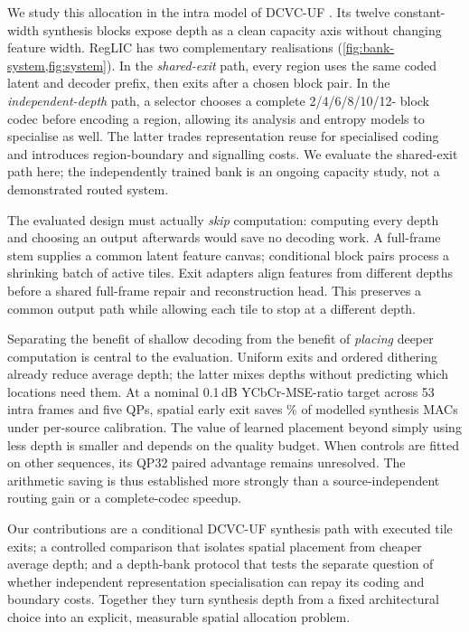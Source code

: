 We study this allocation in the intra model of DCVC-UF
\cite{li2026dcvcuf}. Its twelve constant-width synthesis blocks expose
depth as a clean capacity axis without changing feature width. RegLIC
has two complementary realisations (\cref{fig:bank-system,fig:system}). In the
\emph{shared-exit} path, every region uses the same coded latent and
decoder prefix, then exits after a chosen block pair. In the
\emph{independent-depth} path, a selector chooses a complete 2/4/6/8/10/12-
block codec before encoding a region, allowing its analysis and entropy
models to specialise as well. The latter trades representation reuse
for specialised coding and introduces region-boundary and signalling
costs. We evaluate the shared-exit path here; the independently trained
bank is an ongoing capacity study, not a demonstrated routed system.

The evaluated design must actually \emph{skip} computation: computing
every depth and choosing an output afterwards would save no decoding
work. A full-frame stem supplies a common latent feature canvas;
conditional block pairs process a shrinking batch of active tiles.
Exit adapters align features from different depths before a shared
full-frame repair and reconstruction head. This preserves a common
output path while allowing each tile to stop at a different depth.

Separating the benefit of shallow decoding from the benefit of
\emph{placing} deeper computation is central to the evaluation.
Uniform exits and ordered dithering already reduce average depth;
the latter mixes depths without predicting which locations need them.
At a nominal 0.1\,dB YCbCr-MSE-ratio target across 53 intra frames and
five QPs, spatial early exit saves \MainRouterSaving\% of modelled
synthesis MACs under per-source calibration. The value of learned
placement beyond simply using less depth is smaller and depends on the
quality budget. When controls are fitted on other sequences, its QP32
paired advantage remains unresolved. The arithmetic saving is thus
established more strongly than a source-independent routing gain or a
complete-codec speedup.

Our contributions are a conditional DCVC-UF synthesis path with
executed tile exits; a controlled comparison that isolates spatial
placement from cheaper average depth; and a depth-bank protocol that
tests the separate question of whether independent representation
specialisation can repay its coding and boundary costs. Together they
turn synthesis depth from a fixed architectural choice into an
explicit, measurable spatial allocation problem.
